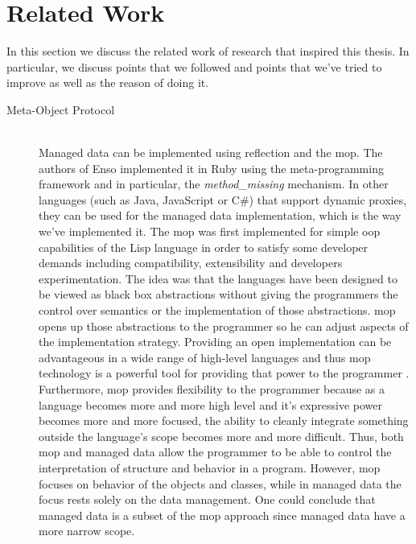 \section{Related Work}\label{Related Work}
In this section we discuss the related work of research that inspired this thesis.
In particular, we discuss points that we followed and points that we've tried to improve as well as the reason of doing it.

\begin{description}

  \item[Meta-Object Protocol]~\\
  Managed data can be implemented using reflection and the \ac{mop}. 
  The authors of Enso \cite{loh2012managed} implemented it in Ruby using the meta-programming framework and in particular, the \textit{method\_missing} mechanism. 
  In other languages (such as Java, JavaScript or C\#) that support dynamic proxies, they can be used for the managed data implementation, which is the way we've implemented it.
  The \ac{mop} \cite{kiczales1991art} was first implemented for simple \ac{oop} capabilities of the Lisp language in order to satisfy some developer demands including compatibility, extensibility and developers experimentation. 
  The idea was that the languages have been designed to be viewed as black box abstractions without giving the programmers the control over semantics or the implementation of those abstractions. 
  \ac{mop} opens up those abstractions to the programmer so he can adjust aspects of the implementation strategy. 
  Providing an open implementation can be advantageous in a wide range of high-level languages and thus \ac{mop} technology is a powerful tool for providing that power to the programmer \cite{kiczales1991art}. 
  Furthermore, \ac{mop} provides flexibility to the programmer because as a language becomes more and more high level and it's expressive power becomes more and more focused, the ability to cleanly integrate something outside the language's scope becomes more and more difficult. 
  Thus, both \ac{mop} and managed data allow the programmer to be able to control the interpretation of structure and behavior in a program.
  However, \ac{mop} focuses on behavior of the objects and classes, while in managed data the focus rests solely on the data management.
  One could conclude that managed data is a subset of the \ac{mop} approach since managed data have a more narrow scope.


\end{description}
